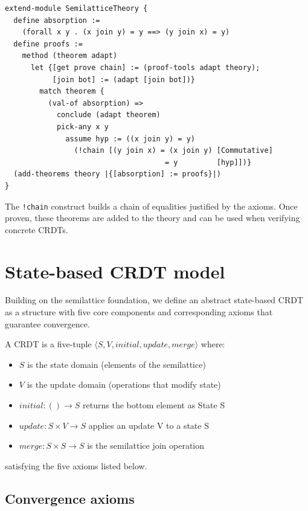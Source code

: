 \begin{lstlisting}[language=Athena,style=athena,label={lst:semilattice-extension},caption={Extending SemilatticeTheory with derived properties}]
extend-module SemilatticeTheory {
  define absorption :=
    (forall x y . (x join y) = y ==> (y join x) = y)
  define proofs :=
    method (theorem adapt)
      let {[get prove chain] := (proof-tools adapt theory);
           [join bot] := (adapt [join bot])}
        match theorem {
          (val-of absorption) => 
            conclude (adapt theorem)
            pick-any x y
              assume hyp := ((x join y) = y)
                (!chain [(y join x) = (x join y) [Commutative]
                                     = y         [hyp]])}
  (add-theorems theory |{[absorption] := proofs}|)
}
\end{lstlisting}

The \lstinline{!chain} construct builds a chain of equalities justified by the axioms. Once proven, these theorems are added to the theory and can be used when verifying concrete CRDTs.

\section{State-based CRDT model}

Building on the semilattice foundation, we define an abstract state-based CRDT as a structure with five core components and corresponding axioms that guarantee convergence.

\begin{definition}\label{def:abstract-crdt}
A CRDT is a five-tuple $\langle S, V, \mathit{initial}, \mathit{update}, \mathit{merge}\rangle$ where:
\begin{itemize}
  \item $S$ is the state domain (elements of the semilattice)
  \item $V$ is the update domain (operations that modify state)
  \item $\mathit{initial}: () \to S$ returns the bottom element as State S
  \item $\mathit{update}: S \times V \to S$ applies an update V to a state S
  \item $\mathit{merge}: S \times S \to S$ is the semilattice join operation
\end{itemize}
satisfying the five axioms listed below.
\end{definition}

\subsection*{Convergence axioms}

